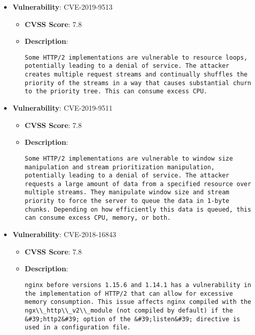 \documentclass{article}
\begin{document}
\begin{itemize}
        \item \textbf{Vulnerability}: CVE-2019-9513
        \begin{itemize}
            \item \textbf{CVSS Score}:  7.8 
            \item \textbf{Description}:
            \parbox[t]{0.9\linewidth}{
                \verb|Some HTTP/2 implementations are vulnerable to resource loops, potentially leading to a denial of service. The attacker creates multiple request streams and continually shuffles the priority of the streams in a way that causes substantial churn to the priority tree. This can consume excess CPU.|
            }
        \end{itemize}
    
        \item \textbf{Vulnerability}: CVE-2019-9511
        \begin{itemize}
            \item \textbf{CVSS Score}:  7.8 
            \item \textbf{Description}:
            \parbox[t]{0.9\linewidth}{
                \verb|Some HTTP/2 implementations are vulnerable to window size manipulation and stream prioritization manipulation, potentially leading to a denial of service. The attacker requests a large amount of data from a specified resource over multiple streams. They manipulate window size and stream priority to force the server to queue the data in 1-byte chunks. Depending on how efficiently this data is queued, this can consume excess CPU, memory, or both.|
            }
        \end{itemize}
    
        \item \textbf{Vulnerability}: CVE-2018-16843
        \begin{itemize}
            \item \textbf{CVSS Score}:  7.8 
            \item \textbf{Description}:
            \parbox[t]{0.9\linewidth}{
                \verb|nginx before versions 1.15.6 and 1.14.1 has a vulnerability in the implementation of HTTP/2 that can allow for excessive memory consumption. This issue affects nginx compiled with the ngx\\_http\\_v2\\_module (not compiled by default) if the &#39;http2&#39; option of the &#39;listen&#39; directive is used in a configuration file.|
            }
        \end{itemize}
    

\end{itemize}
\end{document}
